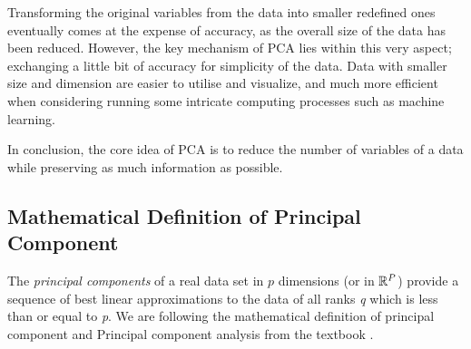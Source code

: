 Transforming the original variables from the data into smaller redefined ones eventually comes at the expense of accuracy, as the overall size of the data has been reduced. However, the key mechanism of PCA lies within this very aspect; exchanging a little bit of accuracy for simplicity of the data. Data with smaller size and dimension are easier to utilise and visualize, and much more efficient when considering running some intricate computing processes such as machine learning.

In conclusion, the core idea of PCA is to reduce the number of variables of a data while preserving as much information as possible.


\subsection{Mathematical Definition of Principal Component}


The \emph{principal components} of a real data set in $p$ dimensions (or in $\mathbb{R}^{P}$) provide a sequence of best linear approximations to the data of all ranks \emph{q} which is less than or equal to \emph{p}. We are following the mathematical definition of principal component and Principal component analysis from the textbook \cite{Friedman}. 

